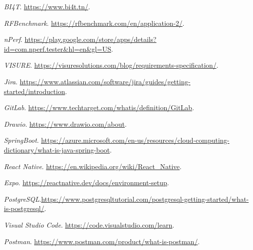 \begin{thebibliography}{99}

 \textit{BI4T}. \url{https://www.bi4t.tn/}.

 \textit{RFBenchmark}. \url{https://rfbenchmark.com/en/application-2/}.

 \textit{nPerf}. \url{https://play.google.com/store/apps/details?id=com.nperf.tester&hl=en&gl=US}.

 \textit{VISURE}. \url{https://visuresolutions.com/blog/requirements-specification/}.

 \textit{Jira}. \url{https://www.atlassian.com/software/jira/guides/getting-started/introduction}.

 \textit{GitLab}. \url{https://www.techtarget.com/whatis/definition/GitLab}.

 \textit{Drawio}. \url{https://www.drawio.com/about}.

 \textit{SpringBoot}. \url{https://azure.microsoft.com/en-us/resources/cloud-computing-dictionary/what-is-java-spring-boot}.

 \textit{React Native}. \url{https://en.wikipedia.org/wiki/React_Native}.

 \textit{Expo}. \url{https://reactnative.dev/docs/environment-setup}.

 \textit{PostgreSQL}.\url{https://www.postgresqltutorial.com/postgresql-getting-started/what-is-postgresql/}.

 \textit{Visual Studio Code}. \url{https://code.visualstudio.com/learn}.

 \textit{Postman}. \url{https://www.postman.com/product/what-is-postman/}.

\end{thebibliography}
